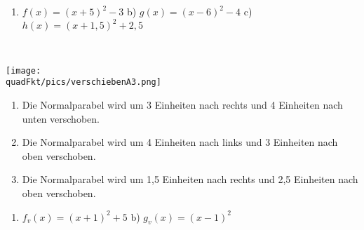 \begin{Answer}[ref=verschiebenA2]
	\begin{enumerate}[label=\alph*)]
		\item $f(x)=\left(x+5\right)^2-3$ \quad b) $g(x)=\left(x-6\right)^2-4$ \quad c) $h(x)=\left(x+1,5\right)^2+2,5$
	\end{enumerate}
\end{Answer}


\begin{Answer}[ref=verschiebenA3]\\
	\begin{minipage}{\linewidth}\centering
		\texttt{[image: \\quadFkt/pics/verschiebenA3.png]}
	\end{minipage}\vspace{.1cm}
	\begin{enumerate}[label=\alph*)]
		\item Die Normalparabel wird um 3 Einheiten nach rechts und 4 Einheiten nach unten verschoben.
		\item Die Normalparabel wird um 4 Einheiten nach links und 3 Einheiten nach oben verschoben.
		\item Die Normalparabel wird um 1,5 Einheiten nach rechts und 2,5 Einheiten nach oben verschoben.
	\end{enumerate}
\end{Answer}
\begin{Answer}[ref=verschiebenA4]
	\begin{enumerate}[label=\alph*)]
		\item $f_v(x)=(x+1)^2+5$ \quad b) $g_v(x)=(x-1)^2$
	\end{enumerate}
\end{Answer}\newpage
